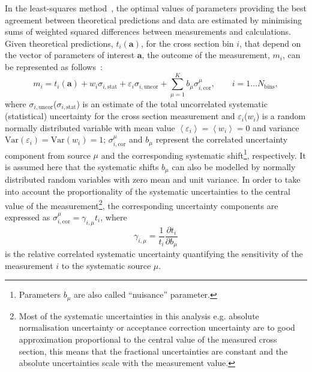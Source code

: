 In the least-squares method~\cite{Behnke:2013pga}, the optimal values of parameters providing the best agreement between theoretical predictions and data are estimated by minimising sums of weighted squared differences between measurements and calculations. Given theoretical predictions, $t_i\left( \mathbf{a} \right)$, for the cross section bin $i$, that depend on the vector of parameters of interest $\mathbf{a}$, the outcome of the measurement, $m_i$, can be represented as follows~\cite{Stump:2001gu,Botje:2001fx}:
\begin{equation}
 m_i = t_i\left( \mathbf{a} \right) + w_{i}\sigma_{i,\text{stat}} + \varepsilon_{i} \sigma_{i,\text{uncor}} + \sum_{\mu=1}^{K}{b_{\mu}\sigma_{i,\text{cor}}^\mu}, \qquad i=1\ldots N_\text{bins},
\end{equation}
where $\sigma_{i,\text{uncor}}$($\sigma_{i,\text{stat}}$) is an estimate of the total uncorrelated systematic (statistical) uncertainty for the cross section measurement and $\varepsilon_{i}$($w_{i}$)  is a random normally distributed variable with mean value $\left\langle \varepsilon_{i}\right\rangle = \left\langle w_{i} \right\rangle = 0$ and variance $\text{Var}\left( \varepsilon_{i}\right) = \text{Var}\left( w_{i}\right)  = 1$; $\sigma_{i,\text{cor}}^\mu$ and $b_{\mu}$ represent the correlated uncertainty component from source $\mu$ and the corresponding systematic shift\footnote{Parameters $b_\mu$ are also called ``nuisance'' parameter.}, respectively. It is assumed here that the systematic shifts $b_{\mu}$ can also be modelled by normally distributed random variables with zero mean and unit variance. In order to take into account the proportionality of the systematic uncertainties to the central value of the measurement\footnote{Most of the systematic uncertainties in this analysis e.g. absolute normalisation uncertainty or acceptance correction uncertainty are to good approximation proportional to the central value of the measured cross section, this means that the fractional uncertainties are constant and the absolute uncertainties scale with the measurement value.}, the corresponding uncertainty components are expressed as $\sigma_{i,\text{cor}}^\mu = \gamma_{i,\mu}t_i$, where 
\begin{equation}
\gamma_{i,\mu}=\frac{1}{{t_i}} \frac{\partial t_i}{\partial b_{\mu}}
\end{equation}
is the relative correlated systematic uncertainty quantifying the sensitivity of the measurement $i$ to the systematic source $\mu$. 

